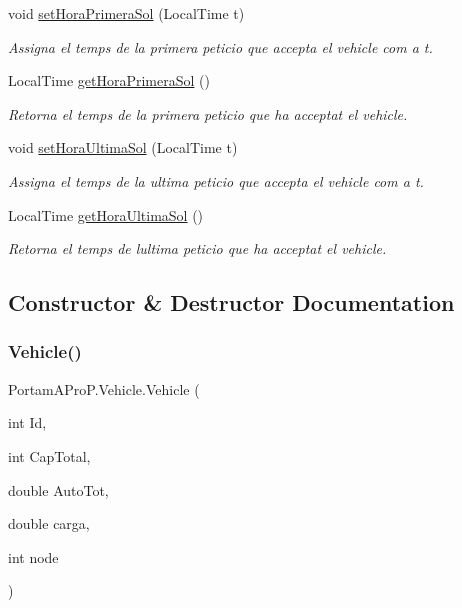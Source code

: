 \begin{DoxyCompactItemize}
void \hyperlink{class_portam_a_pro_p_1_1_vehicle_a4a1d2ae60f3baa2dc01a51ab97e23f27}{set\+Hora\+Primera\+Sol} (Local\+Time t)
\begin{DoxyCompactList}\small\item\em Assigna el temps de la primera peticio que accepta el vehicle com a t. \end{DoxyCompactList}\item 
Local\+Time \hyperlink{class_portam_a_pro_p_1_1_vehicle_a5cdfe0d84974985a89a218c5f8e3a554}{get\+Hora\+Primera\+Sol} ()
\begin{DoxyCompactList}\small\item\em Retorna el temps de la primera peticio que ha acceptat el vehicle. \end{DoxyCompactList}\item 
void \hyperlink{class_portam_a_pro_p_1_1_vehicle_a72944f859922a8a0f79af0d4426c5aad}{set\+Hora\+Ultima\+Sol} (Local\+Time t)
\begin{DoxyCompactList}\small\item\em Assigna el temps de la ultima peticio que accepta el vehicle com a t. \end{DoxyCompactList}\item 
Local\+Time \hyperlink{class_portam_a_pro_p_1_1_vehicle_ac4b240efbba88cd805bdc9cdff58785d}{get\+Hora\+Ultima\+Sol} ()
\begin{DoxyCompactList}\small\item\em Retorna el temps de l\textquotesingle{}ultima peticio que ha acceptat el vehicle. \end{DoxyCompactList}\end{DoxyCompactItemize}


\subsection{Constructor \& Destructor Documentation}
\mbox{\label{class_portam_a_pro_p_1_1_vehicle_aff6c27bb9be6a4463d74a003e1110b1b}} 
\subsubsection{\texorpdfstring{Vehicle()}{Vehicle()}}
{\footnotesize\ttfamily Portam\+A\+Pro\+P.\+Vehicle.\+Vehicle (\begin{DoxyParamCaption}\item[{int}]{Id,  }\item[{int}]{Cap\+Total,  }\item[{double}]{Auto\+Tot,  }\item[{double}]{carga,  }\item[{int}]{node }\end{DoxyParamCaption})}



